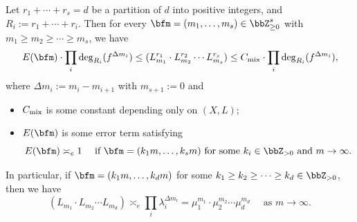 \begin{proposition}\label{prop:estimation_of_mixed_degrees}
	Let $r_1 + \cdots + r_s = d$ be a partition of $d$ into positive integers, and $R_i := r_1 + \cdots + r_i$.
	Then for every $\bfm = (m_1, \ldots, m_s) \in \bbZ_{\geq 0}^s$ with $m_1 \geq m_2 \geq \cdots \geq m_s$, we have
	\[ E(\bfm) \cdot \prod_i \deg_{R_i}(f^{\Delta m_i}) \leq (L_{m_1}^{r_1} \cdot L_{m_2}^{r_2} \cdots L_{m_s}^{r_s}) \leq C_{\mix} \cdot \prod_i \deg_{R_i}(f^{\Delta m_i}), \]
	where $\Delta m_i := m_i - m_{i+1}$ with $m_{s+1} := 0$ and
	\begin{itemize}
		\item $C_{\text{mix}}$ is some constant depending only on $(X,L)$;
		\item $E(\bfm)$ is some error term satisfying
		      \[ E(\bfm) \asymp_e 1 \quad \text{ if } \bfm = (k_1m, \ldots, k_sm) \text{ for some } k_i \in \bbZ_{>0} \text{ and } m \to \infty. \]
	\end{itemize}
	In particular, if $\bfm = (k_1m, \ldots, k_dm)$ for some $k_1 \geq k_2 \geq \cdots \geq k_d \in \bbZ_{>0}$, then we have
	\[ (L_{m_1} \cdot L_{m_2} \cdots L_{m_d}) \asymp_e \prod_i \lambda_{i}^{\Delta m_i} = \mu_1^{m_1} \cdot \mu_2^{m_2} \cdots \mu_d^{m_d} \quad \text{ as } m \to \infty. \]
\end{proposition}
